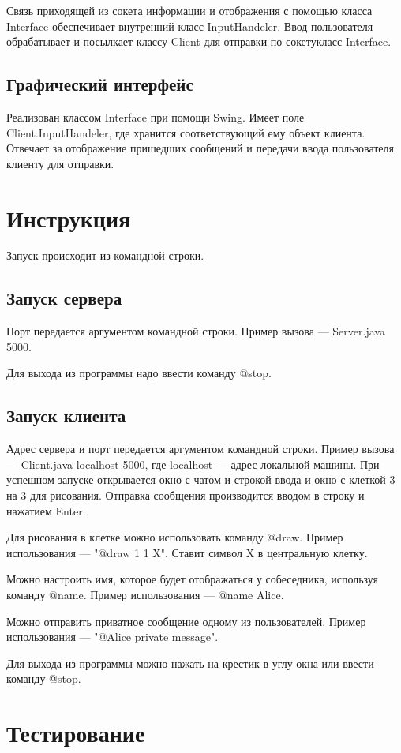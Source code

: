 \documentclass{article}
\begin{document}
Связь приходящей из сокета информации и отображения с помощью класса Interface обеспечивает внутренний класс InputHandeler. Ввод пользователя обрабатывает  и посылкает классу Client для отправки по сокетукласс Interface.

\subsection{Графический интерфейс}
Реализован классом Interface при помощи Swing. Имеет поле Client.InputHandeler, где хранится соответствующий ему объект клиента. Отвечает за отображение пришедших сообщений и передачи ввода пользователя клиенту для отправки.

\section{Инструкция}
Запуск происходит из командной строки.

\subsection{Запуск сервера}
Порт передается аргументом командной строки. Пример вызова --- Server.java 5000. 

Для выхода из программы надо ввести команду @stop.

\subsection{Запуск клиента}
Адрес сервера и порт передается аргументом командной строки. Пример вызова --- Client.java localhost 5000, где localhost --- адрес локальной машины. При успешном запуске открывается окно с чатом и строкой ввода и окно с клеткой 3 на 3 для рисования. Отправка сообщения производится вводом в строку и нажатием Enter.

Для рисования в клетке можно использовать команду @draw. Пример использования --- "@draw 1 1 X". Ставит символ X в центральную клетку.

Можно настроить имя, которое будет отображаться у собеседника, используя команду @name. Пример использования --- @name Alice.

Можно отправить приватное сообщение одному из пользователей. Пример использования --- "@Alice private message".

Для выхода из программы можно нажать на крестик в углу окна или ввести команду @stop.

\section{Тестирование}
\end{document}
